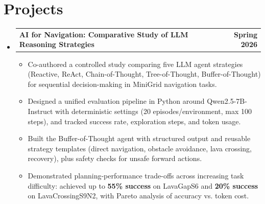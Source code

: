 \documentclass[letterpaper,11pt]{article}
\makeatletter
\newcommand{\resumeItem}[1]{
  \item\small{
    {#1 \vspace{-2pt}}
  }
}
\newcommand{\resumeProjectHeading}[2]{
    \item
    \begin{tabular*}{1.0\textwidth}{l@{\extracolsep{\fill}}r}
      \small#1 & \textbf{\small #2}\\
    \end{tabular*}\vspace{-7pt}
}
\newcommand{\resumeSubHeadingListStart}{\begin{itemize}[leftmargin=0.0in, label={}]}
\newcommand{\resumeSubHeadingListEnd}{\end{itemize}}
\newcommand{\resumeItemListStart}{\begin{itemize}}
\newcommand{\resumeItemListEnd}{\end{itemize}\vspace{-5pt}}
\makeatother
\begin{document}
\section{Projects}
\resumeSubHeadingListStart
  \resumeProjectHeading
      {\textbf{AI for Navigation: Comparative Study of LLM Reasoning Strategies}}{Spring 2026}
      \par{}\par\vspace{-5pt}
      \resumeItemListStart
        \resumeItem{Co-authored a controlled study comparing five LLM agent strategies (Reactive, ReAct, Chain-of-Thought, Tree-of-Thought, Buffer-of-Thought) for sequential decision-making in MiniGrid navigation tasks.}
        \resumeItem{Designed a unified evaluation pipeline in Python around Qwen2.5-7B-Instruct with deterministic settings (20 episodes/environment, max 100 steps), and tracked success rate, exploration steps, and token usage.}
        \resumeItem{Built the Buffer-of-Thought agent with structured output and reusable strategy templates (direct navigation, obstacle avoidance, lava crossing, recovery), plus safety checks for unsafe forward actions.}
        \resumeItem{Demonstrated planning-performance trade-offs across increasing task difficulty: achieved up to \textbf{55\% success} on LavaGapS6 and \textbf{20\% success} on LavaCrossingS9N2, with Pareto analysis of accuracy vs. token cost.}
      \resumeItemListEnd
\resumeSubHeadingListEnd
\vspace{-15pt}
\end{document}
